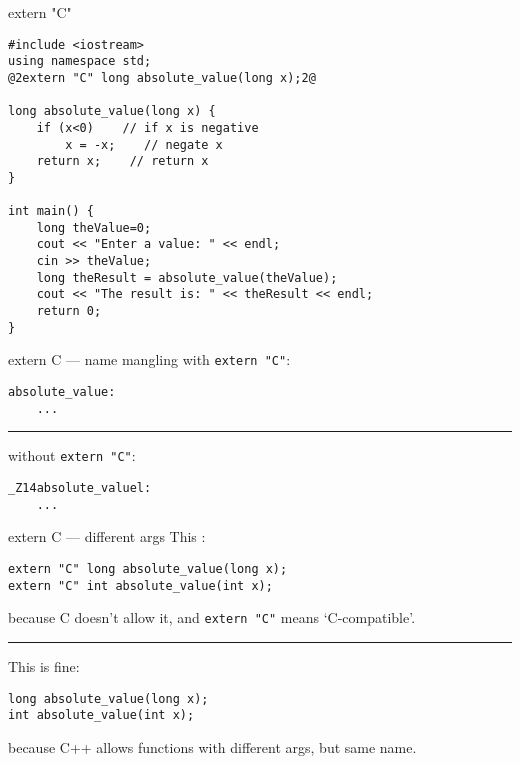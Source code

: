 \begin{frame}[fragile,label=absValueCForExternC]{extern "C"}
\begin{lstlisting}
#include <iostream>
using namespace std;
@2extern "C" long absolute_value(long x);2@

long absolute_value(long x) {
    if (x<0)    // if x is negative
        x = -x;    // negate x
    return x;    // return x
}

int main() {
    long theValue=0;
    cout << "Enter a value: " << endl;
    cin >> theValue;
    long theResult = absolute_value(theValue);
    cout << "The result is: " << theResult << endl;
    return 0;
}
\end{lstlisting}
\end{frame}

\begin{frame}[fragile,label=externCMangle]{extern C --- name mangling}
with \texttt{extern "C"}:
\begin{lstlisting}
absolute_value:
    ...
\end{lstlisting}
\hrule
without \texttt{extern "C"}:
\begin{lstlisting}
_Z14absolute_valuel:
    ...
\end{lstlisting}
\end{frame}

\begin{frame}[fragile,label=externCArgs]{extern C --- different args}
This :
\begin{lstlisting}
extern "C" long absolute_value(long x);
extern "C" int absolute_value(int x);
\end{lstlisting}
because C doesn't allow it, and \texttt{extern "C"} means `C-compatible'.
\hrule
This is fine:
\begin{lstlisting}
long absolute_value(long x);
int absolute_value(int x);
\end{lstlisting}
because C++ allows functions with different args, but same name.
\end{frame}
